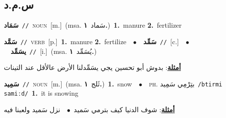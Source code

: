 \documentclass[10pt,a4paper,twoside]{article} %
\begin{document}
\begin{multicols}{2}
\vspace{-3mm}
\subsection*{\color{blue}\foreignlanguage{arabic}{س.م.د}\color{blue}{}} 

{\setlength\topsep{0pt}\textbf{\foreignlanguage{arabic}{سَمَاد}}\ {\color{gray}\texttt{//}\color{black}}\ \textsc{noun}\ [m.]\ \color{gray}(msa. \foreignlanguage{arabic}{سَماد}~\foreignlanguage{arabic}{\textbf{١.}})\color{black}\ \textbf{1.}~manure  \textbf{2.}~fertilizer\ } \vspace{2mm}

{\setlength\topsep{0pt}\textbf{\foreignlanguage{arabic}{سَمَّد}}\ {\color{gray}\texttt{//}\color{black}}\ \textsc{verb}\ [p.]\ \textbf{1.}~manure  \textbf{2.}~fertilize\ \ $\bullet$\ \ \setlength\topsep{0pt}\textbf{\foreignlanguage{arabic}{سَمِّد}}\ {\color{gray}\texttt{//}\color{black}}\ [c.]\ \ $\bullet$\ \ \setlength\topsep{0pt}\textbf{\foreignlanguage{arabic}{يسَمِّد}}\ {\color{gray}\texttt{//}\color{black}}\ [i.]\ \color{gray}(msa. \foreignlanguage{arabic}{يُسَمِّد}~\foreignlanguage{arabic}{\textbf{١.}})\color{black}\  \begin{flushright}\color{gray}\foreignlanguage{arabic}{\textbf{\underline{\foreignlanguage{arabic}{أمثلة}}}: بدوش أبو تحسين يجي يسَمِّدلنا الأرض عالأقل عند التينات}\end{flushright}\color{black}} \vspace{2mm}

{\setlength\topsep{0pt}\textbf{\foreignlanguage{arabic}{سَمِيد}}\ {\color{gray}\texttt{//}\color{black}}\ \textsc{noun}\ [m.]\ \color{gray}(msa. \foreignlanguage{arabic}{ثَلج}~\foreignlanguage{arabic}{\textbf{١.}})\color{black}\ \textbf{1.}~snow\ \ $\bullet$\ \ \textsc{ph.} \color{gray} \foreignlanguage{arabic}{بتِرْمِي سَمِيد}\color{black}\ {\color{gray}\texttt{/{\sffamily btirmi samiːd}/}\color{black}}\ \textbf{1.}~it is snowing\  \begin{flushright}\color{gray}\foreignlanguage{arabic}{\textbf{\underline{\foreignlanguage{arabic}{أمثلة}}}: شوف الدنيا كيف بترمي سَميد\ $\bullet$\ \  نزل سَميد ولعبنا فيه}\end{flushright}\color{black}} \vspace{2mm}


\end{multicols}
\end{document}
